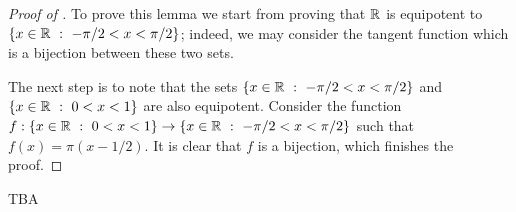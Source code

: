 \begin{proof}[Proof of ]
  To prove this lemma we start from proving that ${\mathbb{R}}$ is equipotent to 
  $\set[-\pi / 2 < x < \pi / 2]{x \in \R}$; indeed, we may consider the tangent
  function which is a bijection between these two sets.

  The next step is to note that the sets $\set[-\pi / 2 < x < \pi / 2]{x \in \R}$ and 
  $\set[0 < x < 1]{x \in \R}$ are also equipotent. Consider the function 
  $f : \set[0 < x < 1]{x \in \R} \to \set[-\pi / 2 < x < \pi / 2]{x \in \R}$
  such that $f(x) = \pi (x - 1 / 2)$. It is clear that $f$ is a bijection, which
  finishes the proof.
\end{proof}

\begin{chapterendexercises}
    \exercise[recommended] TBA
\end{chapterendexercises}
